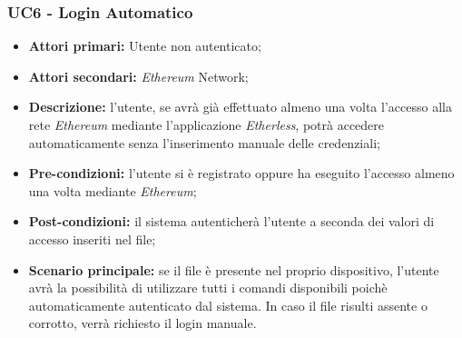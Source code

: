 \subsubsection{UC6 - Login Automatico}
\begin{itemize}
	\item \textbf{Attori primari:} Utente non autenticato;
	\item \textbf{Attori secondari:} \textit{Ethereum\glo} Network;
	\item \textbf{Descrizione:} l'utente, se avrà già effettuato almeno una volta l'accesso alla rete \textit{Ethereum\glo} mediante l'applicazione \textit{Etherless}, potrà accedere automaticamente senza l'inserimento manuale delle credenziali; 
	\item \textbf{Pre-condizioni:} l'utente si è registrato oppure ha eseguito l'accesso almeno una volta mediante \textit{Ethereum\glos};
	\item \textbf{Post-condizioni:} il sistema autenticherà l'utente a seconda dei valori di accesso inseriti nel file;
	\item \textbf{Scenario principale:} se il file è presente nel proprio dispositivo, l'utente avrà la possibilità di utilizzare tutti i comandi disponibili poichè automaticamente autenticato dal sistema. In caso il file risulti assente o corrotto, verrà richiesto il login manuale.
\end{itemize}